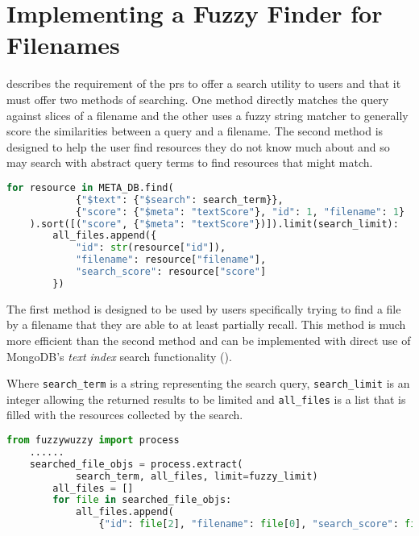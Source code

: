 \section{Implementing a Fuzzy Finder for Filenames}
\label{sec:impl_fuzzy_finder}

 describes the requirement of the \acrfull{prs} to offer a search utility to users and that it must offer two methods of searching. One method directly matches the query against slices of a filename and the other uses a fuzzy string matcher to generally score the similarities between a query and a filename. The second method is designed to help the user find resources they do not know much about and so may search with abstract query terms to find resources that might match.

\begin{lstlisting}[language=python, float, caption={Python code showing a PyMongo text search over the \textit{filename} text index.}, label=lst:pymongo_str_search]
    for resource in META_DB.find(
            {"$text": {"$search": search_term}},
            {"score": {"$meta": "textScore"}, "id": 1, "filename": 1}
    ).sort([("score", {"$meta": "textScore"})]).limit(search_limit):
        all_files.append({
            "id": str(resource["id"]),
            "filename": resource["filename"],
            "search_score": resource["score"]
        })
\end{lstlisting}

The first method is designed to be used by users specifically trying to find a file by a filename that they are able to at least partially recall. This method is much more efficient than the second method and can be implemented with direct use of MongoDB's \textit{text index} search functionality ().

Where \texttt{search\_term} is a string representing the search query, \texttt{search\_limit} is an integer allowing the returned results to be limited and \texttt{all\_files} is a list that is filled with the resources collected by the search.

\begin{lstlisting}[language=python, float, caption={Python code showing a fuzzy string matching search over a collection of resources, using the \textit{fuzzywuzzy} package.}, label=lst:pymongo_fuzzy_search]
    from fuzzywuzzy import process
    ......
    searched_file_objs = process.extract(
            search_term, all_files, limit=fuzzy_limit)
        all_files = []
        for file in searched_file_objs:
            all_files.append(
                {"id": file[2], "filename": file[0], "search_score": file[1]})
\end{lstlisting}

